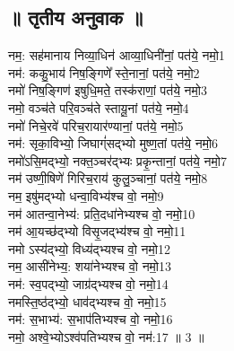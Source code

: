 \subsection{॥ तृतीय अनुवाक ॥}
नम॒: सह॑मानाय निव्या॒धिन॑ आव्या॒धिनी॑नां॒ पत॑ये॒ नमो॒{\small 1}\\
नम॑: ककु॒भाय॑ निष॒ङ्गिणे᳚ स्ते॒नानां॒ पत॑ये॒ नमो॒{\small 2}\\
नमो॑ निष॒ङ्गिण॑ इषुधि॒मते॒ तस्क॑राणां॒ पत॑ये॒ नमो॒{\small 3}\\
नमो॒ वञ्च॑ते परि॒वञ्च॑ते स्तायू॒नां पत॑ये॒ नमो॒{\small 4}\\
नमो॑ निचे॒रवे॑ परिच॒रायार॑ण्यानां॒ पत॑ये॒ नमो॒{\small 5}\\
नम॑: सृका॒विभ्यो॒ जिघाग्ं॑सद्भ्यो मुष्ण॒तां पत॑ये॒ नमो॒{\small 6}\\
नमो॑ऽसि॒मद्भ्यो॒ नक्त॒ञ्चर॑द्भ्यः प्रकृ॒न्तानां॒ पत॑ये॒ नमो॒{\small 7}\\
नम॑ उष्णी॒षिणे॑ गिरिच॒राय॑ कुलु॒ञ्चानां॒ पत॑ये॒ नमो॒{\small 8}\\
नम॒ इषु॑मद्भ्यो धन्वा॒विभ्य॑श्च वो॒ नमो॒{\small 9}\\
नम॑ आतन्वा॒नेभ्य॑: प्रति॒दधा॑नेभ्यश्च वो॒ नमो॒{\small 10}\\
नम॑ आ॒यच्छ॑द्भ्यो विसृ॒जद्भ्य॑श्च वो॒ नमो॒{\small 11}\\
नमो ऽस्य॑द्भ्यो॒ विध्य॑द्भ्यश्च वो॒ नमो॒{\small 12}\\
नम॒ आसी॑नेभ्य॒: शया॑नेभ्यश्च वो॒ नमो॒{\small 13}\\
नम॑: स्व॒पद्भ्यो॒ जाग्र॑द्भ्यश्च वो॒ नमो॒{\small 14}\\
नमस्ति॒ष्ठ॑द्भ्यो॒ धाव॑द्भ्यश्च वो॒ नमो॒{\small 15}\\
नम॑: स॒भाभ्य॑: स॒भाप॑तिभ्यश्च वो॒ नमो॒{\small 16}\\
नमो॒ अश्वे॒भ्योऽश्व॑पतिभ्यश्च वो॒ नम॑:{\small 17} ॥ 3 ॥\\

